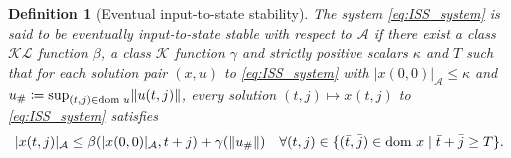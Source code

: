 \documentclass{article}
\DeclarePairedDelimiter{\norm}{\lVert}{\rVert}
\newcommand{\dom}{\text{dom }}
\newtheorem{definition}{Definition}
\begin{document}
\begin{definition}[{Eventual input-to-state stability}]
    The system  \eqref{eq:ISS_system} is said to be eventually input-to-state stable with respect to $\mathcal{A}$ if there exist a class $\mathcal{KL}$ function $\beta$, a class $\mathcal{K}$ function $\gamma$ and strictly positive scalars $\kappa$ and $T$ such that for each solution pair $(x,u)$ to \eqref{eq:ISS_system} with $|{x(0,0)}|_\mathcal{A}\leq \kappa$ and  $u_{\#}\coloneqq \sup_{(t,j)\in \dom u} \norm{u(t,j)}$, every solution $(t,j)\mapsto x(t,j)$ to \eqref{eq:ISS_system} satisfies
    \begin{align*}
        |x(t,j)|_\mathcal{A}\leq \beta(|x(0,0)|_\mathcal{A}, t+j) + \gamma(\norm{u_{\#}}) \quad \forall (t,j) \in  \{(\bar t,\bar j)\in \dom x \mid \bar t+\bar j \geq T\}.
    \end{align*}
\end{definition}
\end{document}
